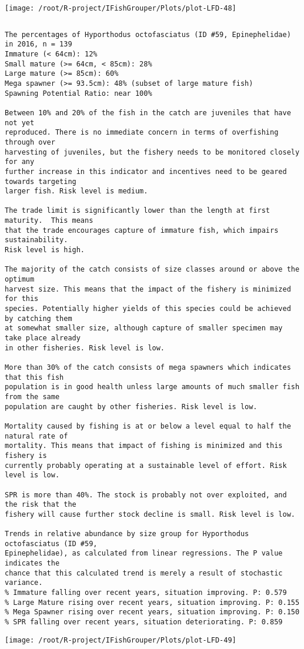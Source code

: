\documentclass{report}\usepackage[]{graphicx}\usepackage[]{color}
\makeatletter
\def\maxwidth{ %
  \ifdim\Gin@nat@width>\linewidth
    \linewidth
  \else
    \Gin@nat@width
  \fi
}
\newenvironment{kframe}{%
 \def\at@end@of@kframe{}%
 \ifinner\ifhmode%
  \def\at@end@of@kframe{\end{minipage}}%
  \begin{minipage}{\columnwidth}%
 \fi\fi%
 \def\FrameCommand##1{\hskip\@totalleftmargin \hskip-\fboxsep
 \colorbox{shadecolor}{##1}\hskip-\fboxsep
     \hskip-\linewidth \hskip-\@totalleftmargin \hskip\columnwidth}%
 \MakeFramed {\advance\hsize-\width
   \@totalleftmargin\z@ \linewidth\hsize
   \@setminipage}}%
 {\par\unskip\endMakeFramed%
 \at@end@of@kframe}
\newenvironment{knitrout}{}{} %
\makeatother
\begin{document}
\begin{knitrout}
\texttt{[image: /root/R-project/IFishGrouper/Plots/plot-LFD-48]} 
\begin{kframe}\begin{verbatim}
\end{verbatim}
\end{kframe}
\clearpage
\newpage
\begin{kframe}\begin{verbatim}The percentages of Hyporthodus octofasciatus (ID #59, Epinephelidae) in 2016, n = 139
Immature (< 64cm): 12%
Small mature (>= 64cm, < 85cm): 28%
Large mature (>= 85cm): 60%
Mega spawner (>= 93.5cm): 48% (subset of large mature fish)
Spawning Potential Ratio: near 100%
 
Between 10% and 20% of the fish in the catch are juveniles that have not yet
reproduced. There is no immediate concern in terms of overfishing through over
harvesting of juveniles, but the fishery needs to be monitored closely for any
further increase in this indicator and incentives need to be geared towards targeting
larger fish. Risk level is medium.

The trade limit is significantly lower than the length at first maturity.  This means
that the trade encourages capture of immature fish, which impairs sustainability.
Risk level is high.

The majority of the catch consists of size classes around or above the optimum
harvest size. This means that the impact of the fishery is minimized for this
species. Potentially higher yields of this species could be achieved by catching them
at somewhat smaller size, although capture of smaller specimen may take place already
in other fisheries. Risk level is low.

More than 30% of the catch consists of mega spawners which indicates that this fish
population is in good health unless large amounts of much smaller fish from the same
population are caught by other fisheries. Risk level is low.
 
Mortality caused by fishing is at or below a level equal to half the natural rate of
mortality. This means that impact of fishing is minimized and this fishery is
currently probably operating at a sustainable level of effort. Risk level is low.
 
SPR is more than 40%. The stock is probably not over exploited, and the risk that the
fishery will cause further stock decline is small. Risk level is low.
 
Trends in relative abundance by size group for Hyporthodus octofasciatus (ID #59,
Epinephelidae), as calculated from linear regressions. The P value indicates the
chance that this calculated trend is merely a result of stochastic variance.
% Immature falling over recent years, situation improving. P: 0.579
% Large Mature rising over recent years, situation improving. P: 0.155
% Mega Spawner rising over recent years, situation improving. P: 0.150
% SPR falling over recent years, situation deteriorating. P: 0.859
\end{verbatim}
\end{kframe}
\texttt{[image: /root/R-project/IFishGrouper/Plots/plot-LFD-49]} 


\end{knitrout}
\end{document}
